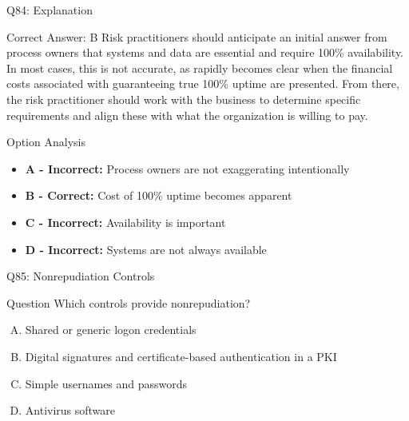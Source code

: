 \documentclass{beamer}
\begin{document}
	\begin{frame}{Q84: Explanation}
		\begin{block}{Correct Answer: B}
			Risk practitioners should anticipate an initial answer from process owners that systems and data are essential and require 100\% availability. In most cases, this is not accurate, as rapidly becomes clear when the financial costs associated with guaranteeing true 100\% uptime are presented. From there, the risk practitioner should work with the business to determine specific requirements and align these with what the organization is willing to pay.
		\end{block}
		\begin{block}{Option Analysis}
			\begin{itemize}
				\item \textbf{A - Incorrect:} Process owners are not exaggerating intentionally
				\item \textbf{B - Correct:} Cost of 100\% uptime becomes apparent
				\item \textbf{C - Incorrect:} Availability is important
				\item \textbf{D - Incorrect:} Systems are not always available
			\end{itemize}
		\end{block}
	\end{frame}
	
	\begin{frame}{Q85: Nonrepudiation Controls}
		\begin{block}{Question}
			Which controls provide nonrepudiation?
		\end{block}
		\begin{enumerate}[(A)]
			\item Shared or generic logon credentials
			\item Digital signatures and certificate-based authentication in a PKI
			\item Simple usernames and passwords
			\item Antivirus software
		\end{enumerate}
	\end{frame}
	
\end{document}
